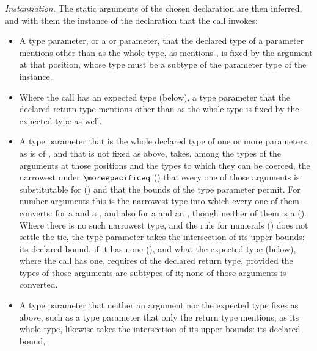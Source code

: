 \emph{Instantiation.}
The static arguments of the chosen declaration are then inferred, and with them
the instance of the declaration that the call invokes:
\begin{itemize}
\item A type parameter, or a  or  parameter, that the
declared type of a parameter mentions other than as the whole type, as
 mentions , is fixed by
the argument at that position, whose type must be a subtype of the parameter
type of the instance.
\item Where the call has an expected type (below), a type parameter that the
declared return type mentions other than as the whole type is fixed by the
expected type as well.
\item A type parameter that is the whole declared type of one or more
parameters, as  is of , and that is not fixed as above,
takes, among the types of the arguments at those positions and the types to
which they can be coerced, the narrowest under $\morespecificeq$
() that every one of those arguments is
substitutable for () and that the bounds of
the type parameter permit.
For number arguments this is the narrowest type into which every one of them
converts:  for a  and a
, and also for a  and an
, though neither of them is a 
().
Where there is no such narrowest type, and the rule for numerals
() does not settle the tie, the type parameter takes
the intersection of its upper bounds: its declared bound,  if it has
none (), and what the expected type (below), where the call
has one, requires of the declared return type, provided the types of those
arguments are subtypes of it; none of those arguments is converted.
\item A type parameter that neither an argument nor the expected type fixes as
above, such as a type parameter that only the return type mentions, as its whole
type, likewise takes the intersection of its upper bounds: its declared bound,

\end{itemize}
